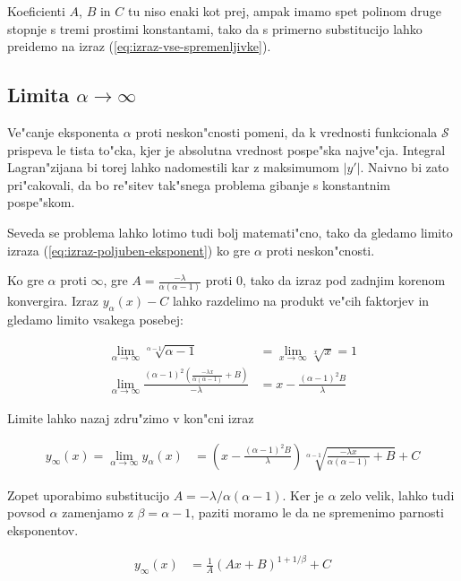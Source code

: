 \documentclass[12pt]{article}
\begin{document}
Koeficienti $A$, $B$ in $C$ tu niso enaki kot prej, ampak imamo spet polinom druge stopnje s tremi prostimi konstantami, tako da s primerno substitucijo lahko preidemo na izraz (\ref{eq:izraz-vse-spremenljivke}). 

\subsection{Limita $\alpha\to\infty$ }

Ve"canje eksponenta $\alpha$ proti neskon"cnosti pomeni, da k vrednosti funkcionala $\mathcal S$ prispeva le tista to"cka, kjer je absolutna vrednost pospe"ska najve"cja. Integral Lagran"zijana bi torej lahko nadomestili kar z maksimumom $|y'|$. Naivno bi zato pri"cakovali, da bo re"sitev tak"snega problema gibanje s konstantnim pospe"skom. 

Seveda se problema lahko lotimo tudi bolj matemati"cno, tako da gledamo limito izraza (\ref{eq:izraz-poljuben-eksponent}) ko gre $\alpha$ proti neskon"cnosti. 

Ko gre $\alpha$ proti $\infty$, gre $A = \frac{-\lambda}{\alpha(\alpha-1)}$ proti 0, tako da izraz pod zadnjim korenom konvergira. Izraz $y_\alpha(x) - C$ lahko razdelimo na produkt ve"cih faktorjev in gledamo limito vsakega posebej:

\begin{align}
  \lim_{\alpha\to\infty} \sqrt[\alpha-1]{\alpha-1} &= \lim_{x\to\infty} \sqrt[x]{x} = 1 \\
  \lim_{\alpha\to\infty} \frac{(\alpha-1)^2 (\frac{-\lambda x}{\alpha(\alpha-1)} + B) }{-\lambda} &= x - \frac{(\alpha-1)^2B}{\lambda} 
\end{align}

Limite lahko nazaj zdru"zimo v kon"cni izraz

\begin{align}
  y_\infty(x) = \lim_{\alpha\to\infty} y_\alpha(x) &= \left(x - \frac{(\alpha-1)^2B}{\lambda}\right)\sqrt[\alpha-1]{\frac{-\lambda x}{\alpha(\alpha-1)} + B} + C
\end{align}

Zopet uporabimo substitucijo $A=-\lambda/\alpha(\alpha-1)$. Ker je $\alpha$ zelo velik, lahko tudi povsod $\alpha$ zamenjamo z $\beta = \alpha-1$, paziti moramo le da ne spremenimo parnosti eksponentov. 

\begin{align}
  y_\infty(x) &= \frac{1}{A}\left(Ax + B\right)^{1+1/\beta} + C
\end{align}
\end{document}
